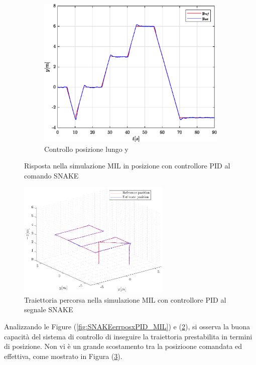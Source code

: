 \begin{figure}
\begin{subfigure}{0.45\textwidth}
		\includegraphics[width=1\textwidth]{Simulazioni/Figure/PID/SNAKE_MIL/PositionControlYPos}
		\caption{Controllo posizione lungo y}
		\label{fig:SNAKEerrposyPID_MIL}
	\end{subfigure}
	\caption{Risposta nella simulazione MIL in posizione con controllore PID al comando SNAKE}
\end{figure}

\begin{figure}
	\centering
	\includegraphics[width=0.65\textwidth]{Simulazioni/Figure/PID/SNAKE_MIL/Trajectory}
	\caption{Traiettoria percorsa nella simulazione MIL con controllore PID al segnale SNAKE}
	\label{fig:SNAKEtraPID_MIL}
\end{figure}

Analizzando le Figure (\ref{fig:SNAKEerrposxPID_MIL}) e (\ref{fig:SNAKEerrposyPID_MIL}), si osserva la buona capacità del sistema di controllo di inseguire la traiettoria prestabilita in termini di posizione. Non vi è un grande scostamento tra la posizioone comandata ed effettiva, come mostrato in Figura (\ref{fig:SNAKEtraPID_MIL}).

